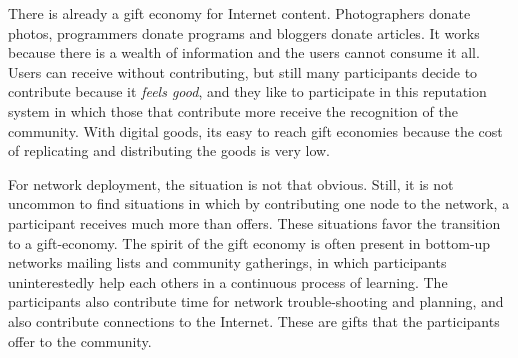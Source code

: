 \documentclass[journal]{IEEEtran}
\begin{document}
There is already a gift economy for Internet content.
Photographers donate photos, programmers donate programs and bloggers donate articles.
It works because there is a wealth of information and the users cannot consume it all.
Users can receive without contributing, but still many participants decide to contribute because it \emph{feels good}, and they like to participate in this reputation system in which those that contribute more receive the recognition of the community.
With digital goods, its easy to reach gift economies because the cost of replicating and distributing the goods is very low.

For network deployment, the situation is not that obvious.
Still, it is not uncommon to find situations in which by contributing one node to the network, a participant receives much more than offers.
These situations favor the transition to a gift-economy.
The spirit of the gift economy is often present in bottom-up networks mailing lists and community gatherings, in which participants uninterestedly help each others in a continuous process of learning.
The participants also contribute time for network trouble-shooting and planning,  and also contribute connections to the Internet.
These are gifts that the participants offer to the community.



\end{document}
